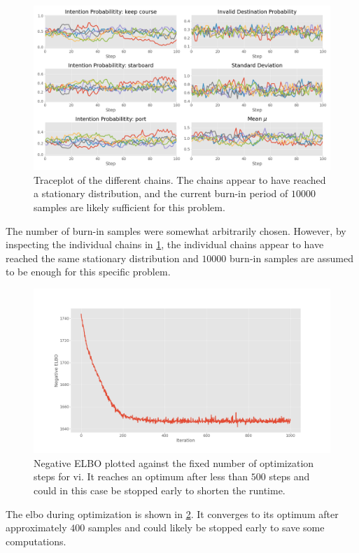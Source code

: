 \begin{figure}[h]
    \centering
    \includegraphics[width=\textwidth]{figures/example_mcmc_trace.png}
    \caption{Traceplot of the different chains. The chains appear to have reached a stationary distribution, and the current burn-in period of $10000$ samples are likely sufficient for this problem.}
    \label{fig:example_mcmc_trace}
\end{figure}

The number of burn-in samples were somewhat arbitrarily chosen. However, by inspecting the individual chains in \cref{fig:example_mcmc_trace}, the individual chains appear to have reached the same stationary distribution and $10000$ burn-in samples are assumed to be enough for this specific problem. 

\begin{figure}[h]
    \centering
    \includegraphics[width=\textwidth]{figures/example_vi_losses.png}
    \caption{Negative ELBO plotted against the fixed number of optimization steps for \acrshort{vi}. It reaches an optimum after less than $500$ steps and could in this case be stopped early to shorten the runtime.}
    \label{fig:example_vi_losses}
\end{figure}

The \acrshort{elbo} during optimization is shown in \cref{fig:example_vi_losses}. It converges to its optimum after approximately $400$ samples and could likely be stopped early to save some computations.















